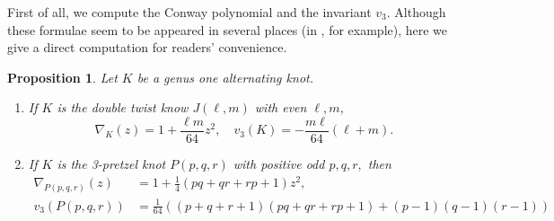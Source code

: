 \documentclass{amsart}
\newtheorem{proposition}[theorem]{Proposition}
\theoremstyle{remark}
\theoremstyle{definition}
\begin{document}
First of all, we compute the Conway polynomial and the invariant $v_{3}$.
Although these formulae seem to be appeared in several places (in \cite{IchiharaWu}, for example), here we give a direct computation for readers' convenience.

\begin{proposition}
\label{proposition:computation}
Let $K$ be a genus one alternating knot.
\begin{enumerate}
\item If $K$ is the double twist know $J(\ell,m)$ with even $\ell,m$,
\[ \nabla_{K}(z)= 1+ \frac{\ell m}{64}z^{2}, \quad v_{3}(K)= -\frac{m \ell}{64}(\ell+m). \]
\item If $K$ is the 3-pretzel knot $P(p,q,r)$ with positive odd $p,q,r,$ then 
\begin{align*} \nabla_{P(p,q,r)}(z)& = 1+ \frac{1}{4}\left( pq+qr+rp+1 \right)z^{2},\\ v_{3}(P(p,q,r))&= \frac{1}{64}\left( (p+q+r+1)(pq+qr+rp+1)+(p-1)(q-1)(r-1) \right)
\end{align*}
\end{enumerate}
\end{proposition}
\end{document}
